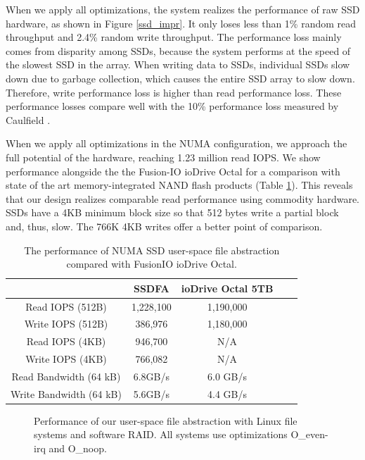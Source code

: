 When we apply all optimizations, the system realizes
the performance of raw SSD hardware, as shown in Figure \ref{ssd_impr}.
It only loses less than 1\% random read throughput
and 2.4\% random write throughput. The performance loss mainly comes from
disparity among SSDs, because the system performs at the speed
of the slowest SSD in the array.
When writing data to SSDs, individual SSDs slow down due to garbage
collection, which causes the entire SSD array to slow down. Therefore, write
performance loss is higher than read performance loss. 
These performance losses compare well with the 
10\% performance loss measured by Caulfield \cite{Caulfield10}.

When we apply all optimizations in the NUMA configuration, we approach the 
full potential of the hardware, reaching 1.23 million read IOPS.
We show performance alongside the
the Fusion-IO ioDrive Octal \cite{fusion} for a comparison with state of the 
art memory-integrated NAND flash products (Table \ref{beat_fusion}). 
This reveals that our design realizes comparable
read performance using commodity hardware.
SSDs have a 4KB minimum block size so that 512 bytes write a partial block 
and, thus, slow.  The 766K 4KB writes offer a better point of comparison.

\begin{table}
\begin{center}
\small
\begin{tabular}{|c|c|c|c|c|}
\hline
& SSDFA & ioDrive Octal 5TB \\
\hline
Read IOPS (512B) & 1,228,100 & 1,190,000 \\
\hline
Write IOPS (512B) & 386,976 & 1,180,000 \\
\hline
Read IOPS (4KB) & 946,700 & N/A \\
\hline
Write IOPS (4KB) & 766,082 & N/A \\
\hline
Read Bandwidth (64 kB) & 6.8GB/s & 6.0 GB/s \\
\hline
Write Bandwidth (64 kB) & 5.6GB/s & 4.4 GB/s \\
\hline
\end{tabular}
\normalsize
\end{center}
\caption{The performance of NUMA SSD user-space file abstraction compared
with FusionIO ioDrive Octal.}
\label{beat_fusion}
\end{table}

\begin{figure}[tb]
\begin{center}
\vspace{-15pt}

\vspace{-15pt}
\caption{Performance of our user-space file abstraction with Linux file systems
	and software RAID. All systems use optimizations O\_even-irq and O\_noop.}
\label{vs_soft_raid}
\end{center}
\end{figure}


